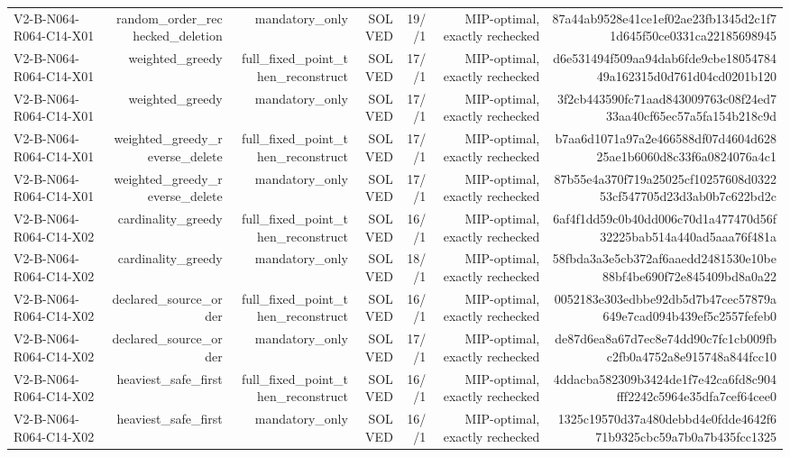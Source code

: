 {\begin{longtable}{lrrrrrr}
V2-B-N064-R064-C14-X01 & random\_order\_rechecked\_deletion & mandatory\_only & SOLVED & 19//1 & MIP-optimal, exactly rechecked & 87a44ab9528e41ce1ef02ae23fb1345d2c1f71d645f50ce0331ca22185698945 \\
V2-B-N064-R064-C14-X01 & weighted\_greedy & full\_fixed\_point\_then\_reconstruct & SOLVED & 17//1 & MIP-optimal, exactly rechecked & d6e531494f509aa94dab6fde9cbe1805478449a162315d0d761d04cd0201b120 \\
V2-B-N064-R064-C14-X01 & weighted\_greedy & mandatory\_only & SOLVED & 17//1 & MIP-optimal, exactly rechecked & 3f2cb443590fc71aad843009763c08f24ed733aa40cf65ec57a5fa154b218c9d \\
V2-B-N064-R064-C14-X01 & weighted\_greedy\_reverse\_delete & full\_fixed\_point\_then\_reconstruct & SOLVED & 17//1 & MIP-optimal, exactly rechecked & b7aa6d1071a97a2e466588df07d4604d62825ae1b6060d8c33f6a0824076a4c1 \\
V2-B-N064-R064-C14-X01 & weighted\_greedy\_reverse\_delete & mandatory\_only & SOLVED & 17//1 & MIP-optimal, exactly rechecked & 87b55e4a370f719a25025cf10257608d032253cf547705d23d3ab0b7c622bd2c \\
V2-B-N064-R064-C14-X02 & cardinality\_greedy & full\_fixed\_point\_then\_reconstruct & SOLVED & 16//1 & MIP-optimal, exactly rechecked & 6af4f1dd59c0b40dd006c70d1a477470d56f32225bab514a440ad5aaa76f481a \\
V2-B-N064-R064-C14-X02 & cardinality\_greedy & mandatory\_only & SOLVED & 18//1 & MIP-optimal, exactly rechecked & 58fbda3a3e5cb372af6aaedd2481530e10be88bf4be690f72e845409bd8a0a22 \\
V2-B-N064-R064-C14-X02 & declared\_source\_order & full\_fixed\_point\_then\_reconstruct & SOLVED & 16//1 & MIP-optimal, exactly rechecked & 0052183e303edbbe92db5d7b47cec57879a649e7cad094b439ef5c2557fefeb0 \\
V2-B-N064-R064-C14-X02 & declared\_source\_order & mandatory\_only & SOLVED & 17//1 & MIP-optimal, exactly rechecked & de87d6ea8a67d7ec8e74dd90c7fc1cb009fbc2fb0a4752a8e915748a844fcc10 \\
V2-B-N064-R064-C14-X02 & heaviest\_safe\_first & full\_fixed\_point\_then\_reconstruct & SOLVED & 16//1 & MIP-optimal, exactly rechecked & 4ddacba582309b3424de1f7e42ca6fd8c904fff2242c5964e35dfa7cef64cee0 \\
V2-B-N064-R064-C14-X02 & heaviest\_safe\_first & mandatory\_only & SOLVED & 16//1 & MIP-optimal, exactly rechecked & 1325c19570d37a480debbd4e0fdde4642f671b9325cbc59a7b0a7b435fcc1325 \\

\end{longtable}}
